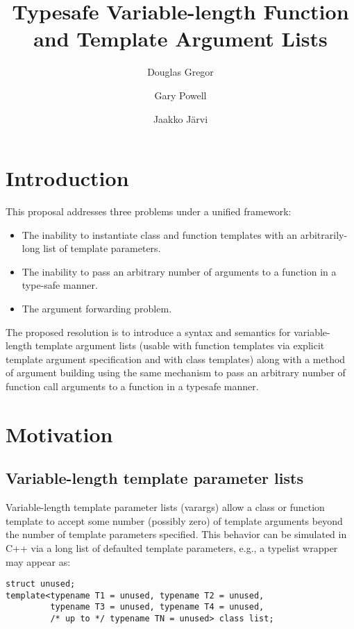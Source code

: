 \documentclass{article}
\begin{document}
\title{Typesafe Variable-length Function and Template Argument Lists}
\author{Douglas Gregor \and Gary Powell \and Jaakko J\"arvi}
\maketitle

\section{Introduction}
This proposal addresses three problems under a unified framework:
\begin{itemize}
\item The inability to instantiate class and function templates with an arbitrarily-long list of template parameters.
\item The inability to pass an arbitrary number of arguments to a function in a type-safe manner.
\item The argument forwarding problem.
\end{itemize}

The proposed resolution is to introduce a syntax and semantics for
variable-length template argument lists (usable with function templates
via explicit template argument specification and with class templates)
along with a method of argument building using the same mechanism to
pass an arbitrary number of function call arguments to a function in a
typesafe manner.

\section{Motivation}
\subsection{Variable-length template parameter lists}
Variable-length template parameter lists (varargs) allow a class or
function template to accept some number (possibly zero) of template
arguments beyond the number of template parameters specified. This
behavior can be simulated in C++ via a long list of defaulted template
parameters, e.g., a typelist wrapper may appear as:

\begin{verbatim}
struct unused;
template<typename T1 = unused, typename T2 = unused, 
         typename T3 = unused, typename T4 = unused, 
         /* up to */ typename TN = unused> class list;
\end{verbatim}
\end{document}
